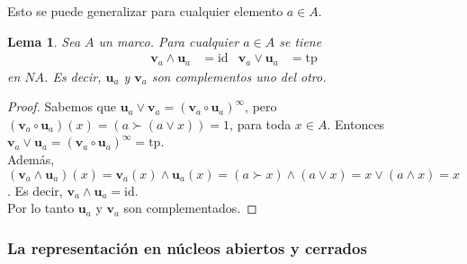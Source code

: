 \documentclass[12pt,letterpaper,titlepage]{article}
\newtheorem{lemma}{Lema}
\theoremstyle{definition}
\renewcommand\sup{\vee}
\renewcommand\inf{\wedge}
\newcommand\unuc[1]{\mathbf u_{#1}}
\newcommand\vnuc[1]{\mathbf v_{#1}}
\newcommand\<{\langle}
\renewcommand\>{\rangle}
\newcommand{\id}{\mathrm{id}}
\newcommand{\tp}{\mathrm{tp}}
\begin{document}
Esto se puede generalizar para cualquier elemento $a\in A$.

\begin{lemma}
  Sea $A$ un marco.
  Para cualquier $a\in A$ se tiene
  \begin{align*}
    \vnuc a\inf\unuc a &= \id
    &
    \vnuc a\sup\unuc a &= \tp
  \end{align*}
  en $NA$.
  Es decir, $\unuc a$ y $\vnuc a$ son complementos uno del otro.
\end{lemma}
\begin{proof}
Sabemos que $\unuc a\vee \vnuc a=(\vnuc a\circ \unuc a)^\infty$, pero $(\vnuc a\circ \unuc a)(x)=(a\succ (a\vee x))=1$, para toda $x\in A$. Entonces $\vnuc a\vee \unuc a=(\vnuc a\circ \unuc a)^\infty=\tp$.\\
Además, $(\vnuc a\wedge \unuc a)(x)=\vnuc a(x)\wedge \unuc a(x)=(a\succ x)\wedge (a\vee x)=x\vee (a\wedge x)=x$. Es decir, $\vnuc a\wedge \unuc a=\id$.\\
Por lo tanto $\unuc a$ y $\vnuc a$ son complementados.
\end{proof}

\subsubsection{La representación en núcleos abiertos y cerrados}
\end{document}
